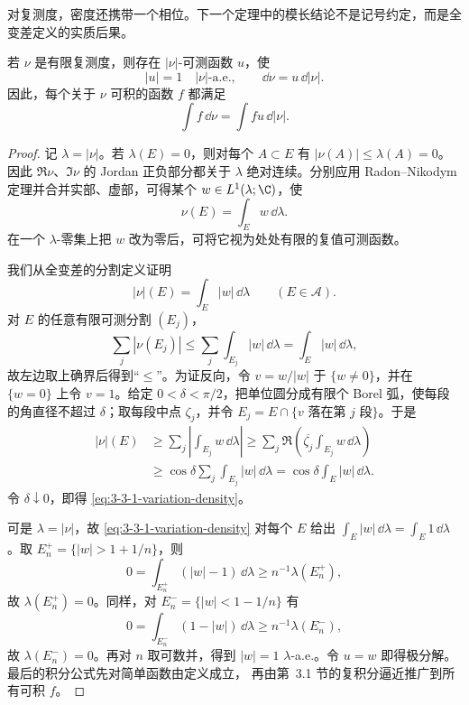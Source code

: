 对复测度，密度还携带一个相位。下一个定理中的模长结论不是记号约定，而是全变差定义的实质后果。

\begin{theorem}[复测度极分解]\label{theorem:3-3-1-3}
若 $\nu$ 是有限复测度，则存在 $|\nu|$-可测函数 $u$，使
\[
  |u|=1\quad |\nu|\text{-a.e.},
  \qquad \dd\nu=u\,\dd|\nu|.
\]
因此，每个关于 $\nu$ 可积的函数 $f$ 都满足
\[
  \int f\,\dd\nu=\int fu\,\dd|\nu|.
\]
\end{theorem}

\begin{proof}
记 $\lambda=|\nu|$。若 $\lambda(E)=0$，则对每个 $A\subset E$ 有
$|\nu(A)|\le\lambda(A)=0$。因此 $\Re\nu$、$\Im\nu$ 的 Jordan 正负部分都关于 $\lambda$
绝对连续。分别应用 Radon--Nikodym 定理并合并实部、虚部，可得某个
$w\in L^1(\lambda;\C)$，使
\[
  \nu(E)=\int_Ew\,\dd\lambda.
\]
在一个 $\lambda$-零集上把 $w$ 改为零后，可将它视为处处有限的复值可测函数。

我们从全变差的分割定义证明
\begin{equation}\label{eq:3-3-1-variation-density}
  |\nu|(E)=\int_E|w|\,\dd\lambda
  \qquad(E\in\mathcal A).
\end{equation}
对 $E$ 的任意有限可测分割 $(E_j)$，
\[
 \sum_j|\nu(E_j)|
 \le\sum_j\int_{E_j}|w|\,\dd\lambda
 =\int_E|w|\,\dd\lambda,
\]
故左边取上确界后得到“$\le$”。为证反向，令
$v=w/|w|$ 于 $\{w\ne0\}$，并在 $\{w=0\}$ 上令 $v=1$。给定
$0<\delta<\pi/2$，把单位圆分成有限个 Borel 弧，使每段的角直径不超过 $\delta$；取每段中点
$\zeta_j$，并令 $E_j=E\cap\{v\text{ 落在第 }j\text{ 段}\}$。于是
\[
 \begin{aligned}
 |\nu|(E)
 &\ge\sum_j\left|\int_{E_j}w\,\dd\lambda\right|
 \ge\sum_j\Re\left(\overline{\zeta_j}\int_{E_j}w\,\dd\lambda\right)\\
 &\ge \cos\delta\sum_j\int_{E_j}|w|\,\dd\lambda
 =\cos\delta\int_E|w|\,\dd\lambda.
 \end{aligned}
\]
令 $\delta\downarrow0$，即得 \eqref{eq:3-3-1-variation-density}。

可是 $\lambda=|\nu|$，故 \eqref{eq:3-3-1-variation-density} 对每个 $E$ 给出
$\int_E|w|\,\dd\lambda=\int_E1\,\dd\lambda$。取
$E_n^+=\{|w|>1+1/n\}$，则
\[
  0=\int_{E_n^+}(|w|-1)\,\dd\lambda\ge n^{-1}\lambda(E_n^+),
\]
故 $\lambda(E_n^+)=0$。同样，对 $E_n^-=\{|w|<1-1/n\}$ 有
\[
  0=\int_{E_n^-}(1-|w|)\,\dd\lambda\ge n^{-1}\lambda(E_n^-),
\]
故 $\lambda(E_n^-)=0$。再对 $n$ 取可数并，得到
$|w|=1$ $\lambda$-a.e.。令 $u=w$ 即得极分解。最后的积分公式先对简单函数由定义成立，
再由第~3.1 节的复积分逼近推广到所有可积 $f$。
\end{proof}

